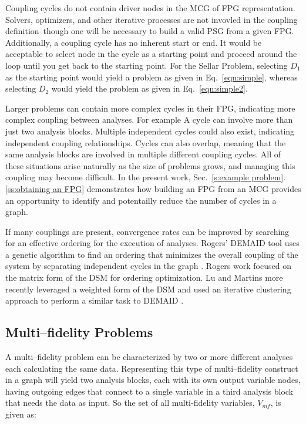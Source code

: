   Coupling cycles do not contain driver nodes in the MCG of FPG representation. 
  Solvers, optimizers, and other iterative processes are not invovled in the coupling 
  definition--though one will be necessary to build a valid PSG from a given FPG. 
  Additionally, a coupling cycle has no inherent start or end. It would be acceptable to select
  node in the cycle as a starting point and proceed around the
  loop until you get back to the starting point. For the Sellar Problem, selecting 
  $D_1$ as the starting point would yield a problem as given in 
  Eq.~\ref{eqn:simple}, whereas selecting $D_2$ would yield the problem as given in 
  Eq.~\ref{eqn:simple2}.

  Larger problems can contain more complex cycles in their FPG, indicating more 
  complex coupling between analyses. For example A cycle can involve more than 
  just two analysis blocks. Multiple independent cycles could also exist, indicating 
  independent coupling relationships. Cycles can also overlap, meaning that the same analysis 
  blocks are involved in multiple different coupling cycles. All of these situations
  arise naturally as the size of problems grows, and managing this coupling may
  become difficult. In the present work, Sec.~\ref{s:example problem}.\ref{ss:obtaining an FPG} 
  demonstrates how building an FPG from an MCG provides an opportunity to 
  identify and potentailly reduce the number of cycles in a graph. 

  If many couplings are present, convergence rates can be improved by 
  searching for an effective ordering for the execution of analyses.
  Rogers' DEMAID tool uses a genetic algorithm to find an ordering that minimizes 
  the overall coupling of the system by separating independent cycles in the 
  graph \cite{rogers1996,rogers1996demaid}. Rogers work focused on the matrix 
  form of the DSM for ordering optimization. Lu and Martins more recently leveraged 
  a weighted form of the DSM and used an iterative clustering approach to perform a 
  similar task to DEMAID \cite{Lu2012}. 

\subsection{Multi--fidelity Problems}
  \label{ss:multi-fideliy problems}
  A multi--fidelity problem can be characterized by two or more different analyses 
  each calculating the same data. Representing this type of multi--fidelity 
  construct in a graph will yield two analysis blocks, each with its own output 
  variable nodes, having outgoing edges that connect to a single variable in a 
  third analysis block that needs the data as input. So the set of all multi-fidelity
  variables, $V_{mf}$, is given as: 


